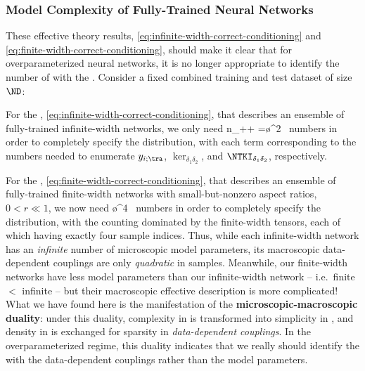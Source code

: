 \subsubsection{Model Complexity of Fully-Trained Neural Networks}
These effective theory results, \eqref{eq:infinite-width-correct-conditioning} and \eqref{eq:finite-width-correct-conditioning}, should make it clear that for overparameterized neural networks, 
it is no longer appropriate to identify
the number of  with the
.
Consider a fixed combined training and test dataset of size $\ND$:
\bi
\item For the %
, \eqref{eq:infinite-width-correct-conditioning}, that describes an ensemble of fully-trained infinite-width networks, we only need
\be
n_{}\NR+\le[\frac{\ND(\ND+1)}{2}\ri] + \le[\frac{\ND(\ND+1)}{2}\ri] =\o{\ND^2} \, 
\ee
numbers in order to completely specify the distribution, with each term corresponding to the numbers needed to enumerate $y_{i;\tra}$, $\ker_{\delta_1 \delta_2}$, and $\NTKI_{\delta_1 \delta_2}$, respectively.
\item For the , \eqref{eq:finite-width-correct-conditioning}, that describes an ensemble of 
fully-trained
finite-width networks with small-but-nonzero aspect ratios, $0 < r \ll 1$, we now need 
\be
\o{\ND^4} \,
\ee
numbers in order to completely specify the distribution, with the counting dominated by the finite-width tensors, each of which having exactly four sample indices. 
\ei{}
Thus, while each infinite-width network has an \emph{infinite} number of microscopic model parameters, its macroscopic data-dependent couplings are only \emph{quadratic} in samples. 
Meanwhile, our finite-width networks have less model parameters than our infinite-width network -- i.e.~finite
$<$ infinite -- but their macroscopic effective description is 
more complicated!
What we have found here is the manifestation of the \textbf{microscopic-macroscopic duality}: 
under this duality,
complexity in  is transformed into simplicity in , 
and density in  is exchanged for sparsity in \emph{data-dependent couplings}. In the overparameterized regime,
this duality indicates that 
we 
really should
identify the  with 
the data-dependent couplings rather than 
the model parameters.







